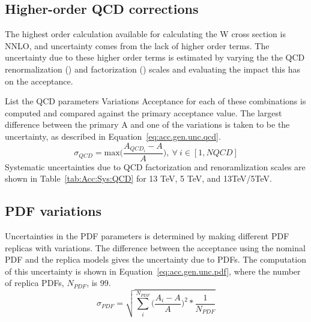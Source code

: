 \subsection{Higher-order QCD corrections}

The highest order calculation available for calculating the W cross section is NNLO, and uncertainty comes from the lack of higher order terms. The uncertainty due to these higher order terms is estimated by varying the the QCD renormalization (\mur) and factorization (\muf) scales and evaluating the impact this has on the acceptance.

List the QCD parameters
Variations
Acceptance for each of these combinations is computed and compared against the primary acceptance value. The largest difference between the primary A and one of the variations is taken to be the uncertainty, as described in Equation~\ref{eq:acc.gen.unc.qcd}. 
\begin{equation}
\sigma_{QCD} = \mathrm{max}\Bigg(\frac{A_{QCD_i}-A}{A}\Bigg),~ \forall~i \in[1, NQCD]
\label{eq:acc.gen.unc.qcd}
\end{equation}
Systematic uncertainties due to QCD factorization and renoramlization scales are shown in Table~\ref{tab:Acc:Sys:QCD} for 13 TeV, 5 TeV, and 13TeV/5TeV.




\subsection{PDF variations}
Uncertainties in the PDF parameters is determined by making different PDF replicas with variations. The difference between the acceptance using the nominal PDF and the replica models gives the uncertainty due to PDFs. 
The computation of this uncertainty is shown in Equation~\ref{eq:acc.gen.unc.pdf}, where the number of replica PDFs, $N_{PDF}$, is 99.
\begin{equation}
\sigma_{PDF}=\sqrt{\sum_{i}^{N_{PDF}} \Bigg(\frac{A_{i}-A}{A}\Bigg)^2*\frac{1}{N_{PDF}}}
\label{eq:acc.gen.unc.pdf}
\end{equation}










